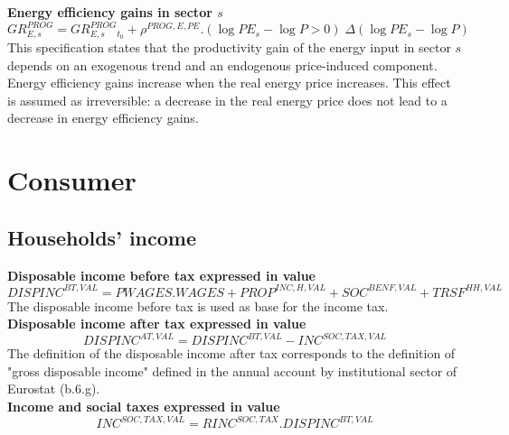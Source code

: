 \documentclass[12pt]{article}
\numberwithin{equation}{section}
\begin{document}
\noindent \textbf{Energy efficiency gains in sector $s$} 
\begin{dmath}
GR^{PROG}_{E, s} = GR^{PROG}_{E, s}_{t_0} + \rho^{PROG,E,PE} . \left( \operatorname{log} PE_{s} - \operatorname{log} P > 0 \right) \; \varDelta \left(\operatorname{log} PE_{s} - \operatorname{log} P\right)
\label{producer.mdlGR_PROG[E, s]}
\end{dmath}
This specification states that the productivity gain of the energy input in sector $s$ depends on an exogenous trend and an endogenous price-induced component. Energy efficiency gains increase when the real energy price increases. This effect is assumed as irreversible: a decrease in the real energy price does not lead to a decrease in energy efficiency gains. \\








\section{Consumer}





\subsection{Households' income}


\noindent \textbf{Disposable income before tax expressed in value} 
\begin{dmath}
DISPINC^{BT,VAL} = PWAGES . WAGES + PROP^{INC,H,VAL} + SOC^{BENF,VAL} + TRSF^{HH,VAL}
\label{consumer.mdlDISPINC_BT_VAL}
\end{dmath}
The disposable income before tax is used as base for the income tax. \\

\noindent \textbf{Disposable income after tax expressed in value} 
\begin{dmath}
DISPINC^{AT,VAL} = DISPINC^{BT,VAL} - INC^{SOC,TAX,VAL}
\label{consumer.mdlDISPINC_AT_VAL}
\end{dmath}
The definition of the disposable income after tax corresponds to the definition of "gross disposable income" defined in the annual account by institutional sector of Eurostat (b.6.g). \\

\noindent \textbf{Income and social taxes expressed in value} 
\begin{dmath}
INC^{SOC,TAX,VAL} = RINC^{SOC,TAX} . DISPINC^{BT,VAL}
\label{consumer.mdlINC_SOC_TAX_VAL}
\end{dmath}
\end{document}
